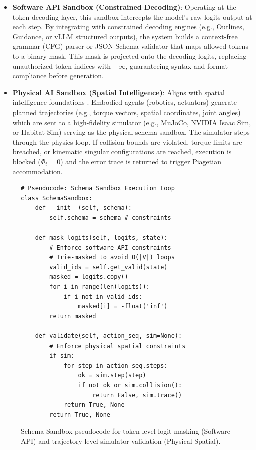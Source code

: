 \documentclass[10pt,journal,compsoc]{IEEEtran}
\begin{document}
\begin{itemize}
    \item \textbf{Software API Sandbox (Constrained Decoding)}: Operating at the token decoding layer, this sandbox intercepts the model's raw logits output at each step. By integrating with constrained decoding engines (e.g., Outlines, Guidance, or vLLM structured outputs), the system builds a context-free grammar (CFG) parser or JSON Schema validator that maps allowed tokens to a binary mask. This mask is projected onto the decoding logits, replacing unauthorized token indices with $-\infty$, guaranteeing syntax and format compliance before generation.
    \item \textbf{Physical AI Sandbox (Spatial Intelligence)}: Aligns with spatial intelligence foundations \cite{li2024spatial}. Embodied agents (robotics, actuators) generate planned trajectories (e.g., torque vectors, spatial coordinates, joint angles) which are sent to a high-fidelity simulator (e.g., MuJoCo, NVIDIA Isaac Sim, or Habitat-Sim) serving as the physical schema sandbox. The simulator steps through the physics loop. If collision bounds are violated, torque limits are breached, or kinematic singular configurations are reached, execution is blocked ($\Phi_t = 0$) and the error trace is returned to trigger Piagetian accommodation.
\end{itemize}

\begin{figure}[t]
\centering
\begin{small}
\begin{verbatim}
# Pseudocode: Schema Sandbox Execution Loop
class SchemaSandbox:
    def __init__(self, schema):
        self.schema = schema # constraints

    def mask_logits(self, logits, state):
        # Enforce software API constraints
        # Trie-masked to avoid O(|V|) loops
        valid_ids = self.get_valid(state)
        masked = logits.copy()
        for i in range(len(logits)):
            if i not in valid_ids:
                masked[i] = -float('inf')
        return masked

    def validate(self, action_seq, sim=None):
        # Enforce physical spatial constraints
        if sim:
            for step in action_seq.steps:
                ok = sim.step(step)
                if not ok or sim.collision():
                    return False, sim.trace()
            return True, None
        return True, None
\end{verbatim}
\end{small}
\caption{Schema Sandbox pseudocode for token-level logit masking (Software API) and trajectory-level simulator validation (Physical Spatial).}
\label{fig:pseudocode}
\end{figure}
\end{document}
